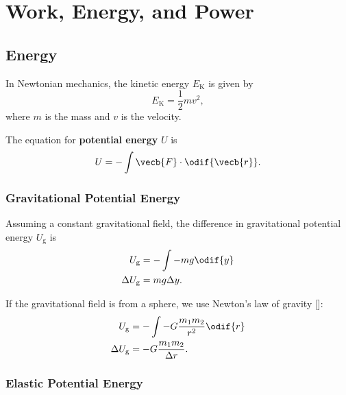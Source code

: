 \chapter{Work, Energy, and Power}


\section{Energy}

In Newtonian mechanics, the kinetic energy \(E_\mathrm{K}\) is given by
\begin{equation} \label{eq:linear-kinetic-energy}
    E_\mathrm{K} = \frac{1}{2} m v^2,
\end{equation}
where \(m\) is the mass and \(v\) is the velocity.

The equation for \textbf{potential energy} \(U\) is
\begin{equation} \label{eq:potential-energy}
    U = - \int \vecb{F} \cdot \odif{\vecb{r}}.
\end{equation}

\subsection{Gravitational Potential Energy}

Assuming a constant gravitational field,
the difference in gravitational potential energy \(U_\mathrm{g}\) is
\begin{equation}
    \begin{aligned}
        U_\mathrm{g} &= - \int - m g \odif{y} \\
        \Delta{U_\mathrm{g}} &= m g \Delta{y}.
    \end{aligned}
\end{equation}

If the gravitational field is from a sphere,
we use Newton's law of gravity []:
\begin{equation}
    \begin{aligned}
        U_\mathrm{g} &= - \int -G \frac{m_1 m_2}{r^2} \odif{r} \\
        \Delta{U_\mathrm{g}} &= -G \frac{m_1 m_2}{\Delta{r}}.
    \end{aligned}
\end{equation}

\subsection{Elastic Potential Energy}

